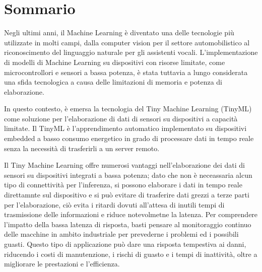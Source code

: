 \chapter*{Sommario} %
\label{sommario}



Negli ultimi anni, il Machine Learning è diventato una delle tecnologie più utilizzate in molti campi, dalla computer vision per il settore automobilistico al riconoscimento del linguaggio naturale per gli assistenti vocali. L'implementazione di modelli di Machine Learning su dispositivi con risorse limitate, come microcontrollori e sensori a bassa potenza, è stata tuttavia a lungo considerata una sfida tecnologica a causa delle limitazioni di memoria e potenza di elaborazione.

In questo contesto, è emersa la tecnologia del Tiny Machine Learning (TinyML) come soluzione per l'elaborazione di dati di sensori su dispositivi a capacità limitate. Il TinyML è l'apprendimento automatico implementato su dispositivi embedded a basso consumo energetico in grado di processare dati in tempo reale senza la necessità di trasferirli a un server remoto.


Il Tiny Machine Learning offre numerosi vantaggi nell'elaborazione dei dati di sensori su dispositivi integrati a bassa potenza; dato che non è neceassaria alcun tipo di connettività per l'inferenza, si possono elaborare i dati in tempo reale direttamnte sul dispositivo e si può evitare di trasferire dati grezzi a terze parti per l'elaborazione, ciò evita i ritardi dovuti all'attesa di inutili tempi di trasmissione delle informazioni e riduce notevolmetne la latenza. Per comprendere l'impatto della bassa latenza di risposta, basti pensare al monitoraggio continuo delle macchine in ambito industriale per prevederne i problemi ed i possibili guasti. Questo tipo di applicazione può dare una risposta tempestiva ai danni, riducendo i costi di manutenzione, i rischi di guasto e i tempi di inattività, oltre a migliorare le prestazioni e l'efficienza. 

